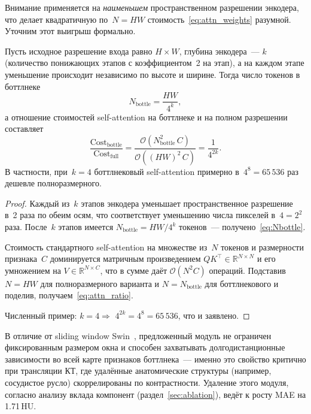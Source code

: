 Внимание применяется на \emph{наименьшем} пространственном разрешении энкодера, что делает квадратичную по~$N=HW$ стоимость~\eqref{eq:attn_weights} разумной. Уточним этот выигрыш формально.

\begin{proposition}
\label{prop:attn_complexity}
Пусть исходное разрешение входа равно $H\times W$, глубина энкодера~--- $k$ (количество понижающих этапов с коэффициентом~2 на этап), а на каждом этапе уменьшение происходит независимо по высоте и ширине. Тогда число токенов в боттлнеке
\begin{equation}
    N_{\mathrm{bottle}} = \frac{HW}{4^k},
    \label{eq:Nbottle}
\end{equation}
а отношение стоимостей self-attention на боттлнеке и на полном разрешении составляет
\begin{equation}
    \frac{\mathrm{Cost}_{\mathrm{bottle}}}{\mathrm{Cost}_{\mathrm{full}}}
    = \frac{\mathcal{O}(N_{\mathrm{bottle}}^2\,C)}{\mathcal{O}((HW)^2\,C)}
    = \frac{1}{4^{2k}}.
    \label{eq:attn_ratio}
\end{equation}
В частности, при~$k=4$ боттлнековый self-attention примерно в~$4^{8}=65\,536$ раз дешевле полноразмерного.
\end{proposition}

\begin{proof}
Каждый из~$k$ этапов энкодера уменьшает пространственное разрешение в~2 раза по обеим осям, что соответствует уменьшению числа пикселей в~$4=2^2$ раза. После~$k$ этапов имеется $N_{\mathrm{bottle}}=HW/4^k$ токенов~--- получено~\eqref{eq:Nbottle}.

Стоимость стандартного self-attention на множестве из~$N$ токенов и размерности признака~$C$ доминируется матричным произведением $QK^\top\in\mathbb{R}^{N\times N}$ и его умножением на $V\in\mathbb{R}^{N\times C}$, что в сумме даёт $\mathcal{O}(N^2 C)$ операций. Подставив $N=HW$ для полноразмерного варианта и $N=N_{\mathrm{bottle}}$ для боттлнекового и поделив, получаем~\eqref{eq:attn_ratio}.

Численный пример: $k=4 \Rightarrow$ $4^{2k}=4^{8}=65\,536$, что и заявлено.
\end{proof}

В отличие от sliding window Swin~\cite{hatamizadeh2021swin}, предложенный модуль не ограничен фиксированным размером окна и способен захватывать долгодистанционные зависимости во всей карте признаков боттлнека~--- именно это свойство критично при трансляции КТ, где удалённые анатомические структуры (например, сосудистое русло) скоррелированы по контрастности. Удаление этого модуля, согласно анализу вклада компонент (раздел~\ref{sec:ablation}), ведёт к росту MAE на 1.71\,HU.

